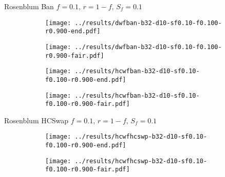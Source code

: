 \documentclass[8pt,a4paper]{beamer}
\begin{document}
	
	\begin{frame}{Rosenblum Ban $f=0.1,\, r=1-f,\,S_f=0.1$}
		\begin{figure}
			\begin{subfigure}{.48\textwidth}
				\centering
				\texttt{[image: ../results/dwfban-b32-d10-sf0.10-f0.100-r0.900-end.pdf]}
			\end{subfigure}
			\begin{subfigure}{.48\textwidth}
				\centering
				\texttt{[image: ../results/dwfban-b32-d10-sf0.10-f0.100-r0.900-fair.pdf]}
			\end{subfigure}
		\end{figure}
		
		\begin{figure}
			\begin{subfigure}{.48\textwidth}
				\centering
				\texttt{[image: ../results/hcwfban-b32-d10-sf0.10-f0.100-r0.900-end.pdf]}
			\end{subfigure}
			\begin{subfigure}{.48\textwidth}
				\centering
				\texttt{[image: ../results/hcwfban-b32-d10-sf0.10-f0.100-r0.900-fair.pdf]}
			\end{subfigure}
		\end{figure}
	\end{frame}
	
	\begin{frame}{Rosenblum HCSwap $f=0.1,\, r=1-f,\,S_f=0.1$}
		\begin{figure}
			\begin{subfigure}{.48\textwidth}
				\centering
				\texttt{[image: ../results/hcwfhcswp-b32-d10-sf0.10-f0.100-r0.900-end.pdf]}
			\end{subfigure}
			\begin{subfigure}{.48\textwidth}
				\centering
				\texttt{[image: ../results/hcwfhcswp-b32-d10-sf0.10-f0.100-r0.900-fair.pdf]}
			\end{subfigure}
		\end{figure}
	\end{frame}
	
	
\end{document}
